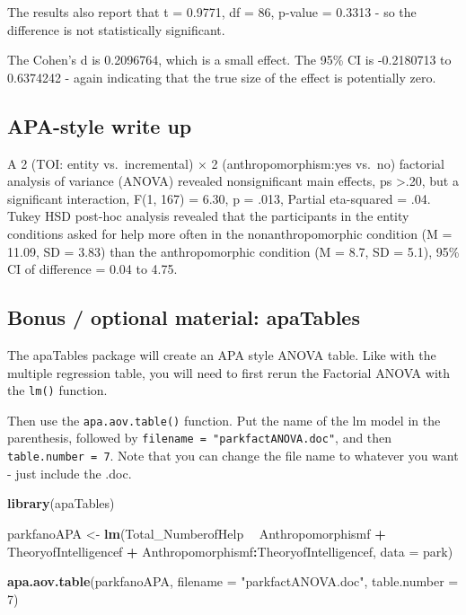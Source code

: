 \documentclass[
]{book}
\newenvironment{Shaded}{\begin{snugshade}}{\end{snugshade}}
\newcommand{\DataTypeTok}[1]{\textcolor[rgb]{0.13,0.29,0.53}{#1}}
\newcommand{\DecValTok}[1]{\textcolor[rgb]{0.00,0.00,0.81}{#1}}
\newcommand{\KeywordTok}[1]{\textcolor[rgb]{0.13,0.29,0.53}{\textbf{#1}}}
\newcommand{\NormalTok}[1]{#1}
\newcommand{\OperatorTok}[1]{\textcolor[rgb]{0.81,0.36,0.00}{\textbf{#1}}}
\newcommand{\StringTok}[1]{\textcolor[rgb]{0.31,0.60,0.02}{#1}}
\begin{document}
The results also report that t = 0.9771, df = 86, p-value = 0.3313 - so the difference is not statistically significant.

The Cohen's d is 0.2096764, which is a small effect. The 95\% CI is -0.2180713 to 0.6374242 - again indicating that the true size of the effect is potentially zero.

\hypertarget{apa-style-write-up-2}{%
\subsection{APA-style write up}\label{apa-style-write-up-2}}

A 2 (TOI: entity vs.~incremental) × 2 (anthropomorphism:yes vs.~no) factorial analysis of variance (ANOVA) revealed nonsignificant main effects, ps \textgreater.20, but a significant interaction, F(1, 167) = 6.30, p = .013, Partial eta-squared = .04. Tukey HSD post-hoc analysis revealed that the participants in the entity conditions asked for help more often in the nonanthropomorphic condition (M = 11.09, SD = 3.83) than the anthropomorphic condition (M = 8.7, SD = 5.1), 95\% CI of difference = 0.04 to 4.75.

\hypertarget{bonus-optional-material-apatables}{%
\subsection{Bonus / optional material: apaTables}\label{bonus-optional-material-apatables}}

The apaTables package will create an APA style ANOVA table. Like with the multiple regression table, you will need to first rerun the Factorial ANOVA with the \texttt{lm()} function.

Then use the \texttt{apa.aov.table()} function. Put the name of the lm model in the parenthesis, followed by \texttt{filename\ =\ "parkfactANOVA.doc"}, and then \texttt{table.number\ =\ 7}. Note that you can change the file name to whatever you want - just include the .doc.

\begin{Shaded}
\begin{Highlighting}[]
\KeywordTok{library}\NormalTok{(apaTables)}

\NormalTok{parkfanoAPA <-}\StringTok{ }\KeywordTok{lm}\NormalTok{(Total_NumberofHelp }\OperatorTok{~}\StringTok{ }\NormalTok{Anthropomorphismf }\OperatorTok{+}\StringTok{ }\NormalTok{TheoryofIntelligencef }\OperatorTok{+}\StringTok{ }\NormalTok{Anthropomorphismf}\OperatorTok{:}\NormalTok{TheoryofIntelligencef, }\DataTypeTok{data =}\NormalTok{ park)}

\KeywordTok{apa.aov.table}\NormalTok{(parkfanoAPA, }\DataTypeTok{filename =} \StringTok{"parkfactANOVA.doc"}\NormalTok{, }\DataTypeTok{table.number =} \DecValTok{7}\NormalTok{)}
\end{Highlighting}
\end{Shaded}
\end{document}
